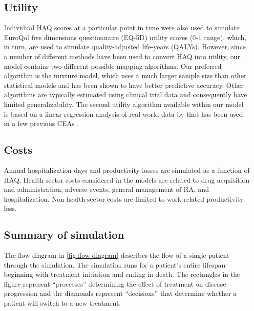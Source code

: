 \documentclass[11pt,final,fleqn]{article}\usepackage[]{graphicx}\usepackage[]{color}
\theoremstyle{plain}
\begin{document}
\subsection{Utility}
Individual HAQ scores at a particular point in time were also used to simulate EuroQol five dimensions questionnaire (EQ-5D) utility scores (0-1 range), which, in turn, are used to simulate quality-adjusted life-years (QALYs). However, since a number of different methods have been used to convert HAQ into utility, our model contains two different possible mapping algorithms. Our preferred algorithm is the \citet{alava2013relationship} mixture model, which uses a much larger sample size than other statistical models and has been shown to have better predictive accuracy. Other algorithms are typically estimated using clinical trial data \citep[e.g.][]{carlson2015economic, stephens2015modelling} and consequently have limited generalizability. The second utility algorithm available within our model is based on a linear regression analysis of real-world data by \citet{wailoo2006modeling} that has been used in a few previous CEAs \citep[e.g.][]{wailoo2008biologic, icer2017tim}.

\subsection{Costs}
Annual hospitalization days and productivity losses are simulated as a function of HAQ. Health sector costs considered in the models are related to drug acquisition and administration, adverse events, general management of RA, and hospitalization. Non-health sector costs are limited to work-related productivity loss.

\subsection{Summary of simulation}
The flow diagram in \autoref{fig:flow-diagram} describes the flow of a single patient through the simulation. The simulation runs for a patient's entire lifespan beginning with treatment initiation and ending in death. The rectangles in the figure represent ``processes'' determining the effect of treatment on disease progression and the diamonds represent ``decisions'' that determine whether a patient will switch to a new treatment.
\end{document}
